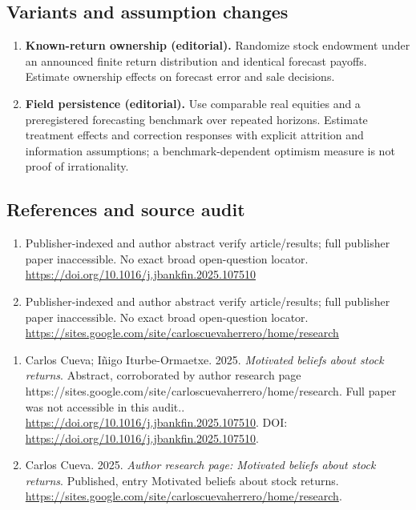 \documentclass[11pt,a4paper]{article}
\begin{document}
\subsection*{Variants and assumption changes}
\begin{enumerate}
\item \textbf{Known-return ownership (editorial).} Randomize stock endowment under an announced finite return distribution and identical forecast payoffs. Estimate ownership effects on forecast error and sale decisions.
\item \textbf{Field persistence (editorial).} Use comparable real equities and a preregistered forecasting benchmark over repeated horizons. Estimate treatment effects and correction responses with explicit attrition and information assumptions; a benchmark-dependent optimism measure is not proof of irrationality.
\end{enumerate}
\subsection*{References and source audit}
\begin{enumerate}
\item Publisher-indexed and author abstract verify article/results; full publisher paper inaccessible. No exact broad open-question locator. \url{https://doi.org/10.1016/j.jbankfin.2025.107510}
\item Publisher-indexed and author abstract verify article/results; full publisher paper inaccessible. No exact broad open-question locator. \url{https://sites.google.com/site/carloscuevaherrero/home/research}
\end{enumerate}
\begin{enumerate}\raggedright
\item\hypertarget{definitions:source:30007587:1}{} Carlos Cueva; Iñigo Iturbe-Ormaetxe. 2025. \emph{Motivated beliefs about stock returns}. Abstract, corroborated by author research page https://sites.google.com/site/carloscuevaherrero/home/research. Full paper was not accessible in this audit..
\url{https://doi.org/10.1016/j.jbankfin.2025.107510}.
DOI: \url{https://doi.org/10.1016/j.jbankfin.2025.107510}.
\item\hypertarget{definitions:source:30007587:2}{} Carlos Cueva. 2025. \emph{Author research page: Motivated beliefs about stock returns}. Published, entry Motivated beliefs about stock returns.
\url{https://sites.google.com/site/carloscuevaherrero/home/research}.
\end{enumerate}
\end{document}
